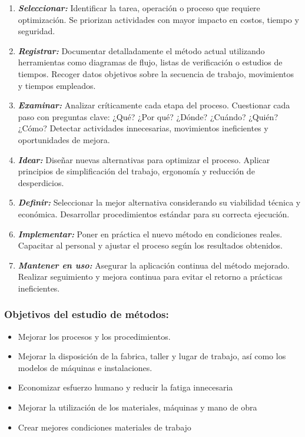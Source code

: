\documentclass[a4paper,oneside,11pt]{article}
\begin{document}
\begin{enumerate}
    \item \textit{\textbf{Seleccionar:}} Identificar la tarea, operación o proceso que requiere optimización. Se priorizan actividades con mayor impacto en costos, tiempo y seguridad.

    \item \textit{\textbf{Registrar:}} Documentar detalladamente el método actual utilizando herramientas como diagramas de flujo, listas de verificación o estudios de tiempos. Recoger datos objetivos sobre la secuencia de trabajo, movimientos y tiempos empleados.

    \item \textit{\textbf{Examinar:}} Analizar críticamente cada etapa del proceso. Cuestionar cada paso con preguntas clave: ¿Qué? ¿Por qué? ¿Dónde? ¿Cuándo? ¿Quién? ¿Cómo? Detectar actividades innecesarias, movimientos ineficientes y oportunidades de mejora. 

    \item \textit{\textbf{Idear:}} Diseñar nuevas alternativas para optimizar el proceso. Aplicar principios de simplificación del trabajo, ergonomía y reducción de desperdicios.

    \item \textit{\textbf{Definir:}} Seleccionar la mejor alternativa considerando su viabilidad técnica y económica. Desarrollar procedimientos estándar para su correcta ejecución.

    \item \textit{\textbf{Implementar:}} Poner en práctica el nuevo método en condiciones reales. Capacitar al personal y ajustar el proceso según los resultados obtenidos.

    \item \textit{\textbf{Mantener en uso:}} Asegurar la aplicación continua del método mejorado. Realizar seguimiento y mejora continua para evitar el retorno a prácticas ineficientes.
\end{enumerate}

\subsubsection{Objetivos del estudio de métodos:}

\begin{itemize}
    \item Mejorar los procesos y los procedimientos.
    \item Mejorar la disposición de la fabrica, taller y lugar de trabajo, así como los modelos de máquinas e instalaciones.
    \item Economizar esfuerzo humano y reducir la fatiga innecesaria
    \item Mejorar la utilización de los materiales, máquinas y mano de obra
    \item Crear mejores condiciones materiales de trabajo
\end{itemize}
\end{document}
